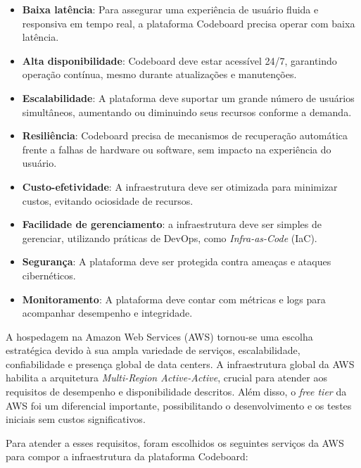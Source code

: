 \begin{itemize}
    \item \textbf{Baixa latência}: Para assegurar uma experiência de usuário fluida e responsiva em tempo real, a plataforma Codeboard precisa operar com baixa latência.
    \item \textbf{Alta disponibilidade}: Codeboard deve estar acessível 24/7, garantindo operação contínua, mesmo durante atualizações e manutenções.
    \item \textbf{Escalabilidade}: A plataforma deve suportar um grande número de usuários simultâneos, aumentando ou diminuindo seus recursos conforme a demanda.
    \item \textbf{Resiliência}: Codeboard precisa de mecanismos de recuperação automática frente a falhas de hardware ou software, sem impacto na experiência do usuário.
    \item \textbf{Custo-efetividade}: A infraestrutura deve ser otimizada para minimizar custos, evitando ociosidade de recursos.
    \item \textbf{Facilidade de gerenciamento}: a infraestrutura deve ser simples de gerenciar, utilizando práticas de DevOps, como \emph{Infra-as-Code} (IaC).
    \item \textbf{Segurança}: A plataforma deve ser protegida contra ameaças e ataques cibernéticos.
    \item \textbf{Monitoramento}: A plataforma deve contar com métricas e logs para acompanhar desempenho e integridade.
\end{itemize}

A hospedagem na Amazon Web Services (AWS) tornou-se uma escolha estratégica devido à sua ampla variedade de serviços, escalabilidade, confiabilidade e presença global de data centers. A infraestrutura global da AWS habilita a arquitetura \emph{Multi-Region Active-Active}, crucial para atender aos requisitos de desempenho e disponibilidade descritos.  Além disso, o \emph{free tier} da AWS foi um diferencial importante, possibilitando o desenvolvimento e os testes iniciais sem custos significativos.

Para atender a esses requisitos, foram escolhidos os seguintes serviços da AWS para compor a infraestrutura da plataforma Codeboard:

